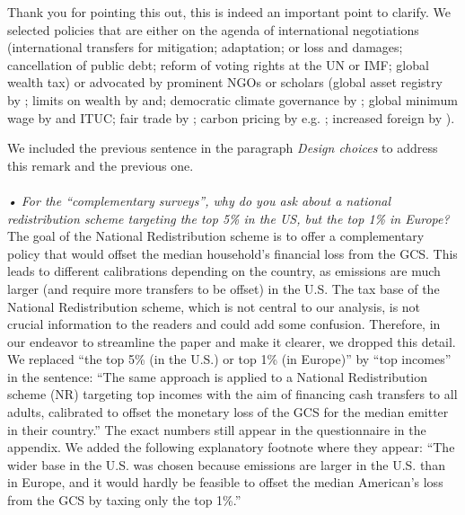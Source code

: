 \documentclass[12pt,english]{article}
\begin{document}

Thank you for pointing this out, this is indeed an important point to clarify. We selected policies that are either on the agenda of international negotiations (international transfers for mitigation; adaptation; or loss and damages; cancellation of public debt; reform of voting rights at the UN or IMF; global wealth tax) or advocated by prominent NGOs or scholars (global asset registry by \citet{icrict_roadmap_2020}; limits on wealth by \citet{robeyns_limitarianism_2024} and\citet{piketty_brief_2022}; democratic climate governance by \citet{dryzek_global_2011}; global minimum wage by \citet{palley_financial_2013} and ITUC; %
fair trade by \citet{hickel_divide_2017}; carbon pricing by e.g. \citet{cramton_global_2017}; increased foreign by \citet{concord_aid_2019}). 

We included the previous sentence in the paragraph \textit{Design choices} to address this remark and the previous one.
~\\ ~\\

\textit{• For the “complementary surveys”, why do you ask about a national redistribution scheme targeting the top 5\% in the US, but the top 1\% in Europe?}~\\

The goal of the National Redistribution scheme is to offer a complementary policy that would offset the median household's financial loss from the GCS. This leads to different calibrations depending on the country, as emissions are much larger (and require more transfers to be offset) in the U.S. The tax base of the National Redistribution scheme, which is not central to our analysis, is not crucial information to the readers and could add some confusion. Therefore, in our endeavor to streamline the paper and make it clearer, we dropped this detail. We replaced ``the top 5\% (in the U.S.) or top 1\% (in Europe)'' by ``top incomes'' in the sentence: ``The same approach is applied to a National Redistribution scheme (NR) targeting top incomes with the aim of financing cash transfers to all adults, calibrated to offset the monetary loss of the GCS for the median emitter in their country.'' The exact numbers still appear in the questionnaire in the appendix. We added the following explanatory footnote where they appear: ``The wider base in the U.S. was chosen because emissions are larger in the U.S. than in Europe, and it would hardly be feasible to offset the median American's loss from the GCS by taxing only the top 1\%.'' 
\end{document}
